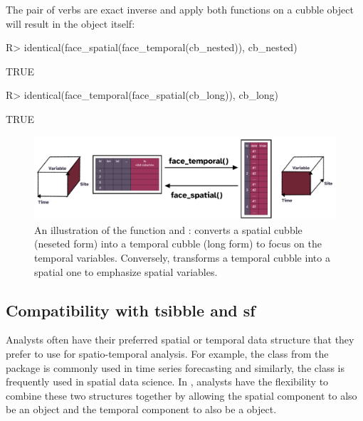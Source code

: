 \documentclass[
  shortnames]{jss}
\begin{document}
The pair of verbs are exact inverse and apply both functions on a cubble object will result in the object itself:

\begin{CodeChunk}
\begin{CodeInput}
R> identical(face_spatial(face_temporal(cb_nested)), cb_nested)
\end{CodeInput}
\begin{CodeOutput}
[1] TRUE
\end{CodeOutput}
\begin{CodeInput}
R> identical(face_temporal(face_spatial(cb_long)), cb_long)
\end{CodeInput}
\begin{CodeOutput}
[1] TRUE
\end{CodeOutput}
\end{CodeChunk}

\begin{CodeChunk}
\begin{figure}

{\centering \includegraphics[width=1\linewidth]{../figures/diagram-keynotes/diagram-keynotes.001} 

}

\caption{An illustration of the function  and :  converts a spatial cubble (neseted form) into a temporal cubble (long form) to focus on the temporal variables. Conversely,  transforms a temporal cubble into a spatial one to emphasize spatial variables.}\label{fig:face}
\end{figure}
\end{CodeChunk}

\hypertarget{compatibility-with-tsibble-and-sf}{%
\subsection{Compatibility with tsibble and sf}\label{compatibility-with-tsibble-and-sf}}

Analysts often have their preferred spatial or temporal data structure that they prefer to use for spatio-temporal analysis. For example, the  class from the  package \citep{tsibble} is commonly used in time series forecasting and similarly, the  class \citep{sf} is frequently used in spatial data science. In , analysts have the flexibility to combine these two structures together by allowing the spatial component to also be an  object and the temporal component to also be a  object.
\end{document}

